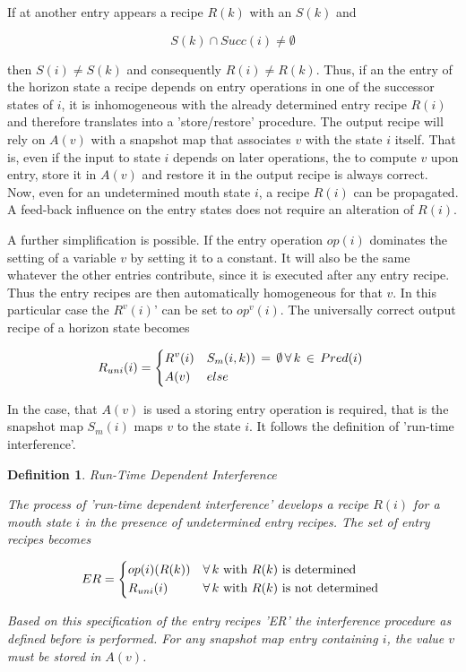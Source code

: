 \documentclass[12pt,a4paper]{scrartcl}
\newtheorem{definition}{Definition}
\begin{document}
If at another entry appears a recipe $R(k)$ with an $S(k)$ and 

\begin{equation}
              S(k) \cap Succ(i) \neq \emptyset
\end{equation}

then \(S(i) \neq S(k)\) and consequently \(R(i) \neq R(k)\). Thus, if an the entry of
the horizon state a recipe depends on entry operations in one of the successor
states of $i$, it is inhomogeneous with the already determined entry recipe
$R(i)$ and therefore translates into a 'store/restore' procedure. The output
recipe will rely on $A(v)$ with a snapshot map that associates $v$ with the
state $i$ itself. That is, even if the input to state $i$ depends on later
operations, the to compute $v$ upon entry, store it in $A(v)$ and restore it in
the output recipe is always correct. Now, even for an undetermined mouth state
$i$, a recipe $R(i)$ can be propagated.  A feed-back influence on the entry
states does not require an alteration of $R(i)$.

A further simplification is possible. If the entry operation $op(i)$ dominates
the setting of a variable $v$ by setting it to a constant.  It will also be the
same whatever the other entries contribute, since it is executed after any
entry recipe. Thus the entry recipes are then automatically homogeneous for
that $v$. In this particular case the $R^v(i)$' can be set to $op^v(i)$.  The
universally correct output recipe of a horizon state becomes 

\begin{equation}
    R_{uni}(i) = \begin{dcases*}
                 R^v(i) & $S_m(i,k))\,=\,\emptyset\,\forall\,k\,\in\,Pred(i)$ \\
                 A(v)   & $else$
                 \end{dcases*}
\end{equation}

In the case, that $A(v)$ is used a storing entry operation is required, that is
the snapshot map $S_m(i)$ maps $v$ to the state $i$. It follows the definition of
'run-time interference'.

\begin{definition}
Run-Time Dependent Interference

The process of 'run-time dependent interference' develops a recipe $R(i)$
for a mouth state $i$ in the presence of undetermined entry recipes. The
set of entry recipes becomes

\begin{equation}
    ER = \begin{dcases*}
            op(i)(R(k)) & $\forall\,k$ with $R(k)$ is determined \\
            R_{uni}(i)  & $\forall\,k$ with $R(k)$ is not determined
        \end{dcases*}
\end{equation}

Based on this specification of the entry recipes 'ER' the interference
procedure as defined before is performed. For any snapshot map entry
containing $i$, the value $v$ must be stored in $A(v)$.
\end{definition}
\end{document}

